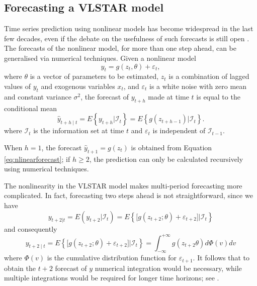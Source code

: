 \subsection{Forecasting a VLSTAR model}\label{Sub24}
Time series prediction using nonlinear models has become widespread in the last few decades, even if the debate on the usefulness of such forecasts is still open \citep[see][]{dienaso1990, kote11}. The forecasts of the nonlinear model, for more than one step ahead, can be generalised via numerical techniques. Given a nonlinear model
\begin{equation}
y_t = g\left(z_t,\theta\right) + \varepsilon_t,
\end{equation}
where $\theta$ is a vector of parameters to be estimated, $z_t$ is a combination of lagged values of $y_t$ and exogenous variables $x_t$, and $\varepsilon_t$ is a white noise with zero mean and constant variance $\sigma^{2}$, the forecast of $y_{t+h}$ made at time $t$ is equal to the conditional mean
\begin{equation}
\label{eq:nlinearforecast}
\hat{y}_{t+h\mid t}=E\left\{y_{t+h}| \mathcal{I}_t\right\}=E\left\{g(z_{t+h-1})|\mathcal{I}_t\right\}.
\end{equation}
where $\mathcal{I}_t$ is the information set at time $t$ and	$\varepsilon_t$ is independent of $\mathcal{I}_{t-1}$.

When $h=1$, the forecast $\hat{y}_{t+1}=g(z_t)$ is obtained from Equation \eqref{eq:nlinearforecast}; if $h \geq 2$, the
prediction can only be calculated recursively using numerical techniques. 

The nonlinearity in the VLSTAR model makes multi-period forecasting more complicated. In fact, forecasting two steps ahead is not straightforward, since we have
\begin{equation}\label{eq:tplus2}
y_{t+2| t} = E\left(y_{t+2}| \mathcal{I}_t\right) = E\left\{\big[g(z_{t+2};\theta)+\varepsilon_{t+2} \big]| \mathcal{I}_t\right\}
\end{equation}
and consequently
\begin{equation}
y_{t+2\mid t} = E\left\{\big[g(z_{t+2};\theta)+\varepsilon_{t+2} \big]| \mathcal{I}_t\right\}=\int_{-\infty}^{+\infty}g(z_{t+2}\theta)d\Phi(v)dv
\end{equation}
where $\Phi(v)$ is the cumulative distribution function for $\varepsilon_{t+1}$. It follows that to obtain the $t+2$ forecast of $y$ numerical integration would be necessary, while multiple integrations would be required for longer time horizons; see \citet*{lute07}. 
 

